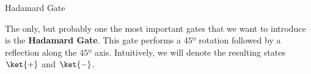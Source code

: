 \documentclass[9pt, handout, aspectratio=169]{beamer}		%
\begin{document}
	\begin{frame}{Hadamard Gate}

		The only, but probably one the most important gates that we want to introduce is the \textbf{Hadamard Gate}. This gate performs a $45º$ rotation followed by a reflection along the $45º$ axis. Intuitively, we will denote the resulting states $\ket{+}$ and $\ket{-}$.



\end{frame}
\end{document}
